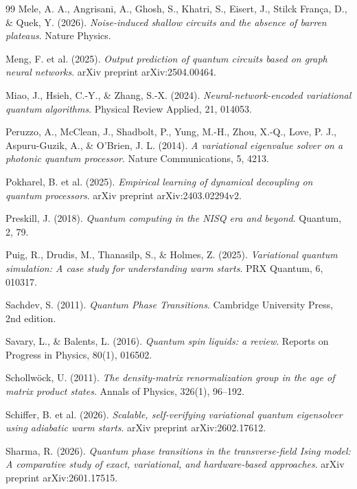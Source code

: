 \documentclass[11pt,a4paper,spanish]{book}
\begin{document}
\begin{thebibliography}{99}
 Mele, A. A., Angrisani, A., Ghosh, S., Khatri, S., Eisert, J., Stilck Fran\c{c}a, D., \& Quek, Y. (2026). \emph{Noise-induced shallow circuits and the absence of barren plateaus}. Nature Physics.

 Meng, F. et al. (2025). \emph{Output prediction of quantum circuits based on graph neural networks}. arXiv preprint arXiv:2504.00464.

 Miao, J., Hsieh, C.-Y., \& Zhang, S.-X. (2024). \emph{Neural-network-encoded variational quantum algorithms}. Physical Review Applied, 21, 014053.

 Peruzzo, A., McClean, J., Shadbolt, P., Yung, M.-H., Zhou, X.-Q., Love, P. J., Aspuru-Guzik, A., \& O'Brien, J. L. (2014). \emph{A variational eigenvalue solver on a photonic quantum processor}. Nature Communications, 5, 4213.

 Pokharel, B. et al. (2025). \emph{Empirical learning of dynamical decoupling on quantum processors}. arXiv preprint arXiv:2403.02294v2.

 Preskill, J. (2018). \emph{Quantum computing in the NISQ era and beyond}. Quantum, 2, 79.

 Puig, R., Drudis, M., Thanasilp, S., \& Holmes, Z. (2025). \emph{Variational quantum simulation: A case study for understanding warm starts}. PRX Quantum, 6, 010317.

 Sachdev, S. (2011). \emph{Quantum Phase Transitions}. Cambridge University Press, 2nd edition.

 Savary, L., \& Balents, L. (2016). \emph{Quantum spin liquids: a review}. Reports on Progress in Physics, 80(1), 016502.

 Schollw\"ock, U. (2011). \emph{The density-matrix renormalization group in the age of matrix product states}. Annals of Physics, 326(1), 96--192.

 Schiffer, B. et al. (2026). \emph{Scalable, self-verifying variational quantum eigensolver using adiabatic warm starts}. arXiv preprint arXiv:2602.17612.

 Sharma, R. (2026). \emph{Quantum phase transitions in the transverse-field Ising model: A comparative study of exact, variational, and hardware-based approaches}. arXiv preprint arXiv:2601.17515.


\end{thebibliography}
\end{document}
